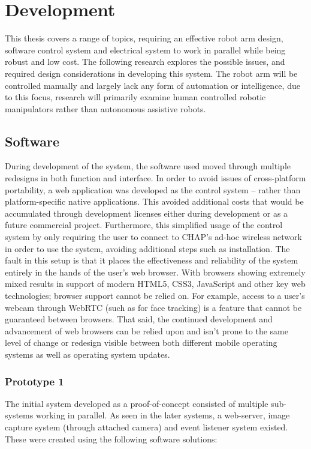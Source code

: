 \documentclass[11pt]{article} %
\begin{document}


\section{Development}
This thesis covers a range of topics, requiring an effective robot arm design, software control system and electrical system to work in parallel while being robust and low cost. The following research explores the possible issues, and required design considerations in developing this system.
The robot arm will be controlled manually and largely lack any form of automation or intelligence, due to this focus, research will primarily examine human controlled robotic manipulators rather than autonomous assistive robots.

\subsection{Software}
During development of the system, the software used moved through multiple redesigns in both function and interface.
In order to avoid issues of cross-platform portability, a web application was developed as the control system – rather than platform-specific native applications. This avoided additional costs that would be accumulated through development licenses either during development or as a future commercial project. Furthermore, this simplified usage of the control system by only requiring the user to connect to CHAP’s ad-hoc wireless network in order to use the system, avoiding additional steps such as installation.
The fault in this setup is that it places the effectiveness and reliability of the system entirely in the hands of the user’s web browser. With browsers showing extremely mixed results in support of modern HTML5, CSS3, JavaScript and other key web technologies; browser support cannot be relied on. For example, access to a user’s webcam through WebRTC (such as for face tracking) is a feature that cannot be guaranteed between browsers. That said, the continued development and advancement of web browsers can be relied upon and isn’t prone to the same level of change or redesign visible between both different mobile operating systems as well as operating system updates.
\subsubsection{Prototype 1}
The initial system developed as a proof-of-concept consisted of multiple sub-systems working in parallel. As seen in the later systems, a web-server, image capture system (through attached camera) and event listener system existed. These were created using the following software solutions:
\end{document}
